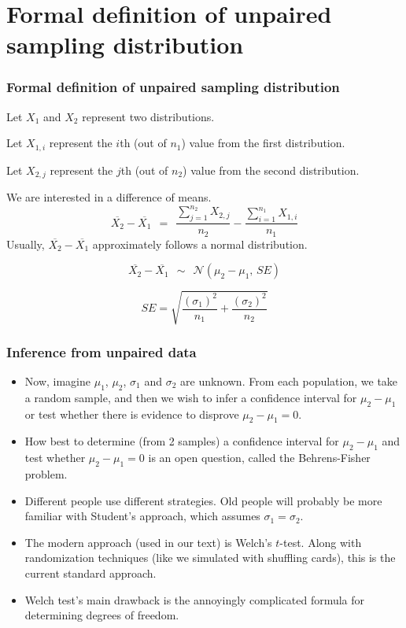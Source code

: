 \documentclass[11pt,containsverbatim,handout]{beamer}
\begin{document}
\section{Formal definition of unpaired sampling distribution}
\begin{frame} 
\frametitle{Formal definition of unpaired sampling distribution}
Let $X_1$ and $X_2$ represent two distributions.\pause

Let $X_{1,i}$ represent the $i$th (out of $n_1$) value from the first distribution.\pause

Let $X_{2,j}$ represent the $j$th (out of $n_2$) value from the second distribution.\pause

We are interested in a difference of means. \pause
$$\overline{X_2}-\overline{X_1} ~~=~~ \frac{\sum\limits_{j=1}^{n_2} X_{2,j}}{n_2} - \frac{\sum\limits_{i=1}^{n_1} X_{1,i}}{n_1}$$\pause
Usually, $\overline{X_2}-\overline{X_1}$ approximately follows a normal distribution.\pause

$$\overline{X_2}-\overline{X_1} ~~\sim~~ \mathcal{N}(\mu_2-\mu_1, \, SE) $$\pause

$$ SE = \sqrt{\frac{(\sigma_1)^2}{n_1}+\frac{(\sigma_2)^2}{n_2}} $$

\end{frame}

\begin{frame}
\frametitle{Inference from unpaired data}
\begin{itemize}
\item Now, imagine $\mu_1$, $\mu_2$, $\sigma_1$ and $\sigma_2$ are unknown. From each population, we take a random sample, and then we wish to infer a confidence interval for $\mu_2-\mu_1$ or test whether there is evidence to disprove $\mu_2-\mu_1 = 0$. \pause
\item How best to determine (from 2 samples) a confidence interval for $\mu_2-\mu_1$ and test whether $\mu_2-\mu_1 = 0$ is an open question, called the Behrens-Fisher problem. \pause
\item Different people use different strategies. Old people will probably be more familiar with Student's approach, which assumes $\sigma_1 = \sigma_2$. \pause
\item The modern approach (used in our text) is Welch's $t$-test. Along with randomization techniques (like we simulated with shuffling cards), this is the current standard approach. \pause
\item Welch test's main drawback is the annoyingly complicated formula for determining degrees of freedom.
\end{itemize}
\end{frame}
\end{document}
